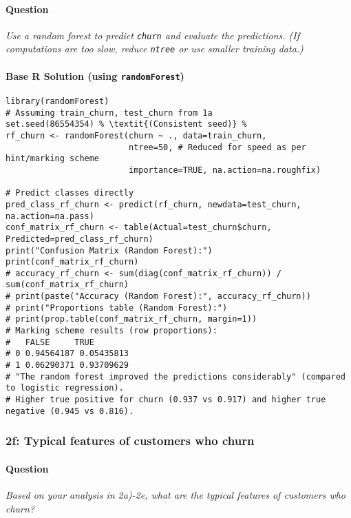 \documentclass[12pt,a4paper]{article}
\newcommand{\Rpackage}[1]{\texttt{#1}} %
\newcommand{\Rcode}[1]{\texttt{#1}} %
\begin{document}
        \paragraph{Question}
        \textit{Use a random forest to predict \Rcode{churn} and evaluate the predictions. (If computations are too slow, reduce \Rcode{ntree} or use smaller training data.)}
        \paragraph{Base R Solution (using \Rpackage{randomForest})}
\begin{lstlisting}
library(randomForest)
# Assuming train_churn, test_churn from 1a
set.seed(86554354) % \textit{(Consistent seed)} %
rf_churn <- randomForest(churn ~ ., data=train_churn, 
                         ntree=50, # Reduced for speed as per hint/marking scheme
                         importance=TRUE, na.action=na.roughfix)

# Predict classes directly
pred_class_rf_churn <- predict(rf_churn, newdata=test_churn, na.action=na.pass)
conf_matrix_rf_churn <- table(Actual=test_churn$churn, Predicted=pred_class_rf_churn)
print("Confusion Matrix (Random Forest):")
print(conf_matrix_rf_churn)
# accuracy_rf_churn <- sum(diag(conf_matrix_rf_churn)) / sum(conf_matrix_rf_churn)
# print(paste("Accuracy (Random Forest):", accuracy_rf_churn))
# print("Proportions table (Random Forest):")
# print(prop.table(conf_matrix_rf_churn, margin=1))
# Marking scheme results (row proportions):
#   FALSE     TRUE
# 0 0.94564187 0.05435813
# 1 0.06290371 0.93709629
# "The random forest improved the predictions considerably" (compared to logistic regression).
# Higher true positive for churn (0.937 vs 0.917) and higher true negative (0.945 vs 0.816).
\end{lstlisting}

    \subsubsection{2f: Typical features of customers who churn}
        \paragraph{Question}
        \textit{Based on your analysis in 2a)-2e, what are the typical features of customers who churn?}
\end{document}
